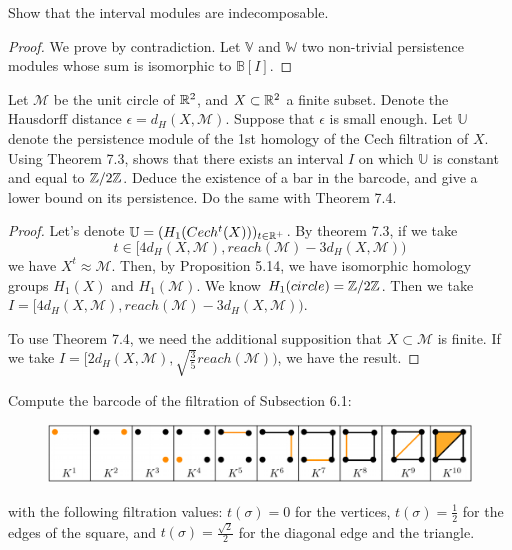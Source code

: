 \noindent\linia

\begin{exercise}
    Show that the interval modules are indecomposable.
\end{exercise}

\begin{proof}
    We prove by contradiction. Let $\mathbb{V}$ and $\mathbb{W}$ two non-trivial persistence modules whose sum is
    isomorphic to $\mathbb{B}[I]$. 
\end{proof}

\noindent\linia

\begin{exercise}
    Let $\mathcal{M}$ be the unit circle of $\mathbb{R}^2$, and $X \subset \mathbb{R}^2$ a
    finite subset. Denote the Hausdorff distance $\epsilon =
    d_H(X,\mathcal{M})$. Suppose that $\epsilon$ is small enough. Let
    $\mathbb{U}$ denote the persistence module of the 1st homology of the Cech
    filtration of $X$. Using Theorem 7.3, shows that there exists an interval
    $I$ on which $\mathbb{U}$ is constant and equal to $\mathbb{Z}/2\mathbb{Z}$. Deduce the existence of a bar in the barcode, and give a lower bound on its persistence. Do the
    same with Theorem 7.4.
\end{exercise}

\begin{proof}
    Let's denote $\mathbb{U} = (H_1(Cech^t(X)))_{t \in \mathbb{R}^+}$. 
    By theorem 7.3, 
    if we take $$t \in [4d_H(X,\mathcal{M}),reach(\mathcal{M}) -
    3d_H(X,\mathcal{M}))$$ we have $X^t \approx \mathcal{M}$. Then, by
    Proposition 5.14, we have isomorphic homology groups $H_1(X)$ and
    $H_1(\mathcal{M})$. We know $H_1(circle) = \mathbb{Z}/2\mathbb{Z}$. Then we take $I = [4d_H(X,\mathcal{M}),reach(\mathcal{M}) -
    3d_H(X,\mathcal{M}))$.

    To use Theorem 7.4, we need the additional supposition that $X \subset
    \mathcal{M}$ is finite. If we take  $I=[2d_H(X,\mathcal{M}),
    \sqrt{\frac{3}{5}}reach(\mathcal{M}))$, we have the result.
\end{proof}

\noindent\linia

\begin{exercise}
    Compute the barcode of the filtration of Subsection 6.1: 
    
    \begin{figure}[H]
        \includegraphics[width=\textwidth]{../images/exercise-52.png}        
    \end{figure}
    \noindent with the
    following filtration values: $t(\sigma) = 0$ for the vertices, $t(\sigma)
    = \frac{1}{2}$ for the edges of the square, and $t(\sigma) =
    \frac{\sqrt{2}}{2}$ for the diagonal edge and the triangle.
\end{exercise}

